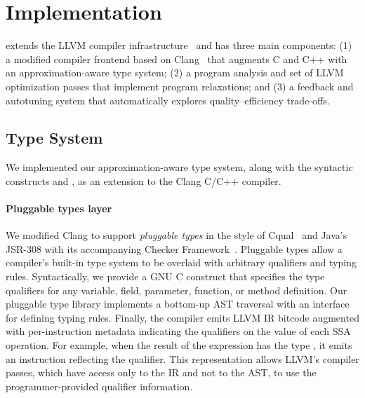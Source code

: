 \section{Implementation}
\label{accept:sec:impl}

\sysname extends the LLVM compiler
infrastructure~\cite{llvm} and has three main components:
(1) a modified compiler frontend based on Clang~\cite{clang}
that augments C and C++ with an
approximation-aware type system;
(2) a program analysis and set of LLVM optimization passes that implement
program relaxations; and
(3) a feedback and autotuning system that automatically explores
quality--efficiency trade-offs.

\subsection{Type System}

We implemented our approximation-aware type system, along with the syntactic
constructs  and , as an extension to the Clang
C/C++ compiler.

\paragraph{Pluggable types layer}

We modified Clang to support \emph{pluggable types} in the style of
Cqual~\cite{cqual} and Java's JSR-308 with its accompanying Checker
Framework~\cite{jsr308, papi}.
Pluggable types allow a compiler's built-in type system to be overlaid with
arbitrary qualifiers and typing rules. Syntactically, we
provide a GNU C  construct that specifies the
type qualifiers for any variable, field, parameter, function, or method
definition. Our pluggable type library implements a bottom-up AST traversal
with an interface for defining typing rules.
Finally, the compiler emits LLVM IR bitcode
augmented with per-instruction metadata indicating the qualifiers on the
value of each SSA operation. For example, when the result of the
expression  has the type , it emits an
 instruction reflecting the qualifier. This
representation allows LLVM's compiler passes, which have access only to the IR
and not to the AST, to use the programmer-provided qualifier
information.


